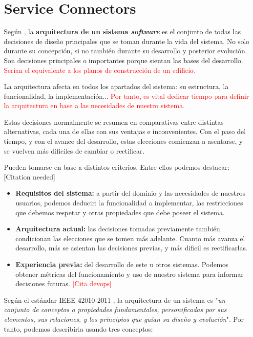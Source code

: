 \chapter{Service Connectors}

Según \cite{taylorSoftwareArchitectureFoundations2009}, la {\bf arquitectura de un sistema \textit{software}} es el conjunto de todas las decisiones de diseño principales que se toman durante la vida del sistema. No solo durante su concepción, si no también durante su desarrollo y posterior evolución. Son decisiones principales o importantes porque sientan las bases del desarrollo. \textcolor{red}{Serían el equivalente a los planos de construcción de un edificio.}

La arquitectura afecta en todos los apartados del sistema: su estructura, la funcionalidad, la implementación... \textcolor{red}{Por tanto, es vital dedicar tiempo para definir la arquitectura en base a las necesidades de nuestro sistema.}

Estas decisiones normalmente se resumen en comparativas entre distintas alternativas, cada una de ellas con sus ventajas e inconvenientes. Con el paso del tiempo, y con el avance del desarrollo, estas elecciones comienzan a asentarse, y se vuelven más dificiles de cambiar o rectificar.

Pueden tomarse en base a distintos criterios. Entre ellos podemos destacar: [Citation needed]

    \begin{itemize}
        \item \textbf{Requisitos del sistema:} a partir del dominio y las necesidades de nuestros usuarios, podemos deducir: la funcionalidad a implementar, las restricciones que debemos respetar y otras propiedades que debe poseer el sistema.
        \item \textbf{Arquitectura actual:} las decisiones tomadas previamente también condicionan las elecciones que se tomen más adelante. Cuanto más avanza el desarrollo, más se asientan las decisiones previas, y más dificil es rectificarlas.
        \item \textbf{Experiencia previa:} del desarrollo de este u otros sistemas. Podemos obtener métricas del funcionamiento y uso de nuestro sistema para informar decisiones futuras. \textcolor{red}{[Cita devops]}
    \end{itemize}

Según el estándar IEEE 42010-2011 \cite{ieeeStandard420102011Systems2011}, la arquitectura de un sistema es "\textit{un conjunto de conceptos o propiedades fundamentales, personificadas por sus elementos, sus relaciones, y los principios que guían su diseño y evolución}". Por tanto, podemos describirla usando tres conceptos: \cite{perryFoundationsStudySoftware1992}

